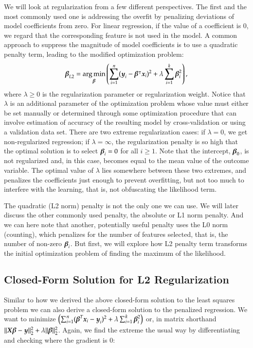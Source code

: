 \begin{refsection}
We will look at regularization from a few different perspectives. The first and the most commonly used one is addressing the overfit by penalizing deviations of model coefficients from zero. For linear regression, if the value of a coefficient is 0, we regard that the corresponding feature is not used in the model. A common approach to suppress the magnitude of model coefficients is to use a quadratic penalty term, leading to the modified optimization problem:
$$
\boldsymbol{\beta}_{L2} = \operatorname*{arg\,min}_{\boldsymbol{\beta}} \left(\sum_{i=1}^n (\boldsymbol{y}_i - \boldsymbol{\beta}^\intercal\boldsymbol{x}_i )^2 + \lambda \sum_{i=1}^k \boldsymbol{\beta}_i^2\right),
$$
where $\lambda \geq 0$ is the regularization parameter or regularization weight. Notice that $\lambda$ is an additional parameter of the optimization problem whose value must either be set manually or determined through some optimization procedure that can involve estimation of accuracy of the resulting model by cross-validation or using a validation data set. There are two extreme regularization cases: if $\lambda = 0$, we get non-regularized regression; if $\lambda=\infty$, the regularization penalty is so high that the optimal solution is to select $\boldsymbol{\beta}_i = 0$ for all $i\geq 1$. Note that the intercept, $\boldsymbol{\beta}_0$, is not regularized and, in this case, becomes equal to the mean value of the outcome variable. The optimal value of $\lambda$ lies somewhere between these two extremes, and penalizes the coefficients just enough to prevent overfitting, but not too much to interfere with the learning, that is, not obfuscating the likelihood term.

The quadratic (L2 norm) penalty is not the only one we can use. We will later discuss the other commonly used penalty, the absolute or L1 norm penalty. And we can here note that another, potentially useful penalty uses the L0 norm (counting), which penalizes for the number of features selected, that is, the number of non-zero $\boldsymbol{\beta}_i$. But first, we will explore how L2 penalty term transforms the initial optimization problem of finding the maximum of the likelihood.

\subsection*{Closed-Form Solution for L2 Regularization}

Similar to how we derived the above closed-form solution to the least squares problem we can also derive a closed-form solution to the penalized regression. We want to minimize $\left(\sum_{i=1}^n (\boldsymbol{\beta}^T\boldsymbol{x}_i - \boldsymbol{y}_i)^2 + \lambda \sum_{i=1}^k \boldsymbol{\beta}_i^2\right)$ or, in matrix shorthand $\lVert \boldsymbol{X}\boldsymbol{\beta} - \boldsymbol{y} \rVert^2_2 + \lambda\lVert \boldsymbol{\beta} \rVert^2_2$. Again, we find the extreme the usual way by differentiating and checking where the gradient is 0:


\end{refsection}
